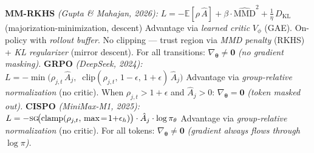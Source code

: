 \documentclass[11pt]{article}
\begin{document}
\begin{algorithm}[t]
\begin{algorithmic}[0]
\Statex
\Statex \textbf{MM-RKHS} \textit{(Gupta \& Mahajan, 2026):}
\Statex \hspace{\algorithmicindent} $L = -\mathbb{E}[\rho\, \hat{A}] + \beta \cdot \widehat{\text{MMD}}^2 + \tfrac{1}{\eta}\, D_{\text{KL}}$ \; (majorization-minimization, descent)
\Statex \hspace{\algorithmicindent} Advantage via \textit{learned critic} $V_\phi$ (GAE). On-policy with \textit{rollout buffer}.
\Statex \hspace{\algorithmicindent} No clipping --- trust region via \textit{MMD penalty} (RKHS) + \textit{KL regularizer} (mirror descent).
\Statex \hspace{\algorithmicindent} For all transitions: $\nabla_{\boldsymbol{\theta}} \neq \mathbf{0}$ \textit{(no gradient masking).}
\Statex
\Statex \textbf{GRPO} \textit{(DeepSeek, 2024):}
\Statex \hspace{\algorithmicindent} $L = -\min\!\big(\rho_{j,t}\, \hat{A}_j,\;\; \text{clip}(\rho_{j,t},\, 1{-}\epsilon,\, 1{+}\epsilon)\, \hat{A}_j\big)$
\Statex \hspace{\algorithmicindent} Advantage via \textit{group-relative normalization} (no critic).
\Statex \hspace{\algorithmicindent} When $\rho_{j,t} > 1{+}\epsilon$ and $\hat{A}_j > 0$: $\nabla_{\boldsymbol{\theta}} = \mathbf{0}$ \textit{(token masked out).}
\Statex
\Statex \textbf{CISPO} \textit{(MiniMax-M1, 2025):}
\Statex \hspace{\algorithmicindent} $L = -\textsc{sg}\!\big(\text{clamp}(\rho_{j,t},\, \max\!=\!1{+}\epsilon_h)\big) \cdot \hat{A}_j \cdot \log \pi_\theta$
\Statex \hspace{\algorithmicindent} Advantage via \textit{group-relative normalization} (no critic).
\Statex \hspace{\algorithmicindent} For all tokens: $\nabla_{\boldsymbol{\theta}} \neq \mathbf{0}$ \textit{(gradient always flows through $\log \pi$).}
\end{algorithmic}
\end{algorithm}
\end{document}
